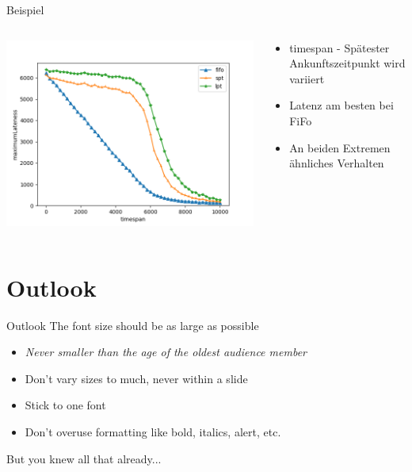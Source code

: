 \documentclass[aspectratio=169,10pt]{beamer}
\begin{document}
\begin{frame}[fragile]{Beispiel}

\begin{columns}
	\begin{column}{0.57\paperwidth}
		\vspace{0.5pt}
		\includegraphics[width=\linewidth, clip]{images/Figure_2_2}
	\end{column}
	\begin{column}[c]{0.43\paperwidth}
		\begin{itemize}
			\item timespan - Sp\"atester Ankunftszeitpunkt wird variiert
			\item Latenz am besten bei FiFo
			\item An beiden Extremen \"ahnliches Verhalten
		\end{itemize}
	\end{column}
\end{columns}
\end{frame}

\section{Outlook}
\begin{frame}{Outlook}
\Large
The font size should be as large as possible
\begin{itemize}
\item \textit{Never smaller than the age of the oldest audience member}
\item Don't vary sizes to much, never within a slide
\item Stick to one font
\item Don't overuse formatting like bold, italics, alert, etc.
\end{itemize}
But you knew all that already...
\end{frame}
\end{document}
